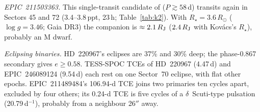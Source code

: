 \documentclass{aastex701}
\begin{document}
\textit{EPIC~211503363.} This single-transit candidate of \citet{Kovacs2020} ($P\gtrsim58$\,d)
transits again in Sectors 45 and 72 (3.4--3.8\,ppt, 23\,h; Table~\ref{tab:k2}). With
$R_\star=3.6\,R_\odot$ ($\log g=3.46$; Gaia DR3) the companion is $\approx2.1\,R_{\rm J}$
($2.4\,R_{\rm J}$ with Kov\'acs's $R_\star$), probably an M dwarf.

\textit{Eclipsing binaries.} HD~220967's eclipses are 37\% and 30\% deep; the phase-0.867 secondary
gives $e\geq0.58$. TESS-SPOC TCEs of HD~220967 (4.47\,d) and EPIC~246089124 (9.54\,d) each rest on
one Sector~70 eclipse, with flat other epochs. EPIC~211489484's 106.94-d TCE joins two primaries ten
cycles apart, excluded by four others; its 0.24-d TCE is five cycles of a $\delta$~Scuti-type
pulsation (20.79\,d$^{-1}$), probably from a neighbour 26$''$ away.
\end{document}
